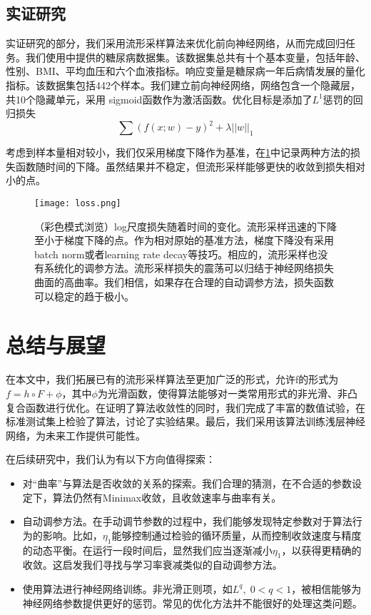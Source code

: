 \documentclass[macfonts]{njuthesis}
\begin{document}
\section{实证研究}

实证研究的部分，我们采用流形采样算法来优化前向神经网络，从而完成回归任务。我们使用\cite{lars}中提供的糖尿病数据集。该数据集总共有十个基本变量，包括年龄、性别、BMI、平均血压和六个血液指标。响应变量是糖尿病一年后病情发展的量化指标。该数据集包括442个样本。我们建立前向神经网络，网络包含一个隐藏层，共10个隐藏单元，采用 sigmoid函数作为激活函数。优化目标是添加了$L^1$惩罚的回归损失
$$
\sum(f(x;w)-y)^2+\lambda||w||_1
$$

考虑到样本量相对较小，我们仅采用梯度下降作为基准，在\ref{fig:loss}中记录两种方法的损失函数随时间的下降。虽然结果并不稳定，但流形采样能够更快的收敛到损失相对小的点。
  
  \begin{figure}[H]
\centering
  \texttt{[image: loss.png]}
   \caption{（彩色模式浏览）log尺度损失随着时间的变化。流形采样迅速的下降至小于梯度下降的点。作为相对原始的基准方法，梯度下降没有采用batch norm或者learning rate decay等技巧。相应的，流形采样也没有系统化的调参方法。流形采样损失的震荡可以归结于神经网络损失曲面的高曲率。我们相信，如果存在合理的自动调参方法，损失函数可以稳定的趋于极小。}
\label{fig:loss}
\end{figure}

\chapter{总结与展望}
在本文中，我们拓展已有的流形采样算法至更加广泛的形式，允许f的形式为$f=h\circ F+\phi$，其中$\phi$为光滑函数，使得算法能够对一类常用形式的非光滑、非凸复合函数进行优化。在证明了算法收敛性的同时，我们完成了丰富的数值试验，在标准测试集上检验了算法，讨论了实验结果。最后，我们采用该算法训练浅层神经网络，为未来工作提供可能性。

在后续研究中，我们认为有以下方向值得探索：
\begin{itemize}
\item 对“曲率”与算法是否收敛的关系的探索。我们合理的猜测，在不合适的参数设定下，算法仍然有Minimax收敛，且收敛速率与曲率有关。
\item 自动调参方法。在手动调节参数的过程中，我们能够发现特定参数对于算法行为的影响。比如，$\eta_1$能够控制通过检验的循环质量，从而控制收敛速度与精度的动态平衡。在运行一段时间后，显然我们应当逐渐减小$\eta_1$，以获得更精确的收敛。这启发我们寻找与学习率衰减类似的自动调参方法。
\item 使用算法进行神经网络训练。非光滑正则项，如$L^q,\;0<q<1$，被相信能够为神经网络参数提供更好的惩罚。常见的优化方法并不能很好的处理这类问题。
\end{itemize}
\end{document}
